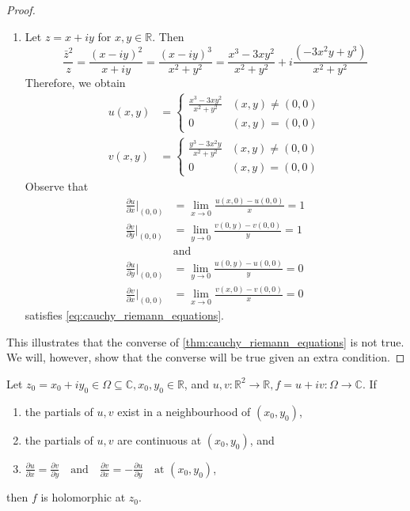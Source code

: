 \documentclass[11pt, oneside]{book}
\begin{document}
\begin{eg}
\begin{proof}
\begin{enumerate}
			\item Let $z = x + iy$ for $x, y \in \mathbb{R}$. Then
			\begin{equation*}
				\frac{\bar{z}^2}{z} = \frac{(x - iy)^2}{x + iy} = \frac{(x - iy)^3}{x^2 + y^2} = \frac{x^3 - 3xy^2}{x^2 + y^2} + i \frac{(-3x^2y + y^3)}{x^2 + y^2}
			\end{equation*}
			Therefore, we obtain
			\begin{align*}
				u(x, y) &= \begin{cases}
					\frac{x^3 - 3xy^2}{x^2 + y^2} & (x, y) \neq (0, 0) \\
					0	& (x, y) = (0, 0)
				\end{cases} \\
				v(x, y) &= \begin{cases}
					\frac{y^3 - 3x^2y}{x^2 + y^2} & (x, y) \neq (0, 0) \\
					0	& (x, y) = (0, 0)
				\end{cases}
			\end{align*}
			Observe that
			\begin{align*}
				\frac{\partial u}{\partial x} \Bigr|_{(0, 0)}
					&= \lim_{x \to 0} \frac{u(x, 0) - u(0, 0)}{x} = 1 \\
				\frac{\partial v}{\partial y} \Bigr|_{(0, 0)}
					&= \lim_{y \to 0} \frac{v(0, y) - v(0, 0)}{y} = 1 \\
					&\text{and} \\
				\frac{\partial u}{\partial y} \Bigr|_{(0, 0)}
					&= \lim_{y \to 0} \frac{u(0, y) - u(0, 0)}{y} = 0 \\
				\frac{\partial v}{\partial x} \Bigr|_{(0, 0)}
					&= \lim_{x \to 0} \frac{v(x, 0) - v(0, 0)}{x} = 0
			\end{align*}
			satisfies \cref{eq:cauchy_riemann_equations}.
		\end{enumerate}
		This illustrates that the converse of \cref{thm:cauchy_riemann_equations} is not true. We will, however, show that the converse will be true given an extra condition.
	\end{proof}
\end{eg}

\begin{thm}\label{thm:conditional_converse_of_cre}
	Let $z_0 = x_0 + iy_0 \in \Omega \subseteq \mathbb{C}, x_0, y_0 \in \mathbb{R}$, and $u, v : \mathbb{R}^2 \to \mathbb{R}, f = u + iv : \Omega \to \mathbb{C}$. If
	\begin{enumerate}
		\item the partials of $u, v$ exist in a neighbourhood of $(x_0, y_0)$,
		\item the partials of $u, v$ are continuous at $(x_0, y_0)$, and
		\item $\frac{\partial u}{\partial x} = \frac{\partial v}{\partial y} \quad \text{and} \quad \frac{\partial v}{\partial x} = - \frac{\partial u}{\partial y} \quad \text{at } (x_0, y_0)$,
	\end{enumerate}
	then $f$ is holomorphic at $z_0$.
\end{thm}
\end{document}
